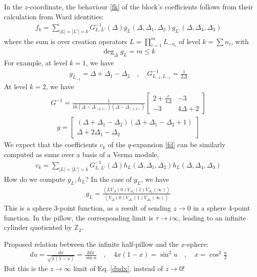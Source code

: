 \documentclass[12pt,a4paper]{article}
\begin{document}
In the $z$-coordinate, the behaviour \eqref{fk} of the block's coefficients follows from their calculation from Ward identities:
\begin{align}
 f_k = \sum_{|L|=|L'|=k} G^{-1}_{L,L'}(\Delta) g_L(\Delta,\Delta_1,\Delta_2)g_{L'}(\Delta,\Delta_4,\Delta_3)
\end{align}
where the sum is over creation operators $L=\prod_{i=1}^m L_{-n_i}$ of level $k=\sum n_i$, with 
\begin{align}
 \deg_\Delta g_L = m\leq k
\end{align}
For example, at level $k=1$, we have 
\begin{align}
 g_{L_{-1}} = \Delta + \Delta_1-\Delta_2 \quad , \quad G^{-1}_{L_{-1},L_{-1}} = \frac{1}{2\Delta} 
\end{align}
At level $k=2$, we have 
\begin{align}
G^{-1} = \frac{1}{16(\Delta-\Delta_{(2,1)})(\Delta-\Delta_{(1,2)})} \begin{bmatrix} 2+\frac{c}{4\Delta} & -3 \\ -3 & 4\Delta+2 \end{bmatrix}
\end{align}
\begin{align}
 g = \begin{bmatrix} (\Delta+\Delta_1-\Delta_2)(\Delta+\Delta_1-\Delta_2+1) \\ \Delta+2\Delta_1-\Delta_2 \end{bmatrix}
\end{align}
We expect that the coefficients $c_k$ of the $q$-expansion \eqref{fd} can be similarly computed as sums over a basis of a Verma module, 
\begin{align}
 c_k = \sum_{|L|=|L'|=k} G^{-1}_{L,L'}(\Delta) h_L(\Delta,\Delta_1,\Delta_2)h_L(\Delta,\Delta_4,\Delta_3)
\end{align}
How do we compute $g_L,h_L$? In the case of $g_L$, we have 
\begin{align}
 g_L = \frac{\left< LV_{\Delta}(0)V_{\Delta_1}(1)V_{\Delta_2}(\infty)\right>}{\left< V_{\Delta}(0)V_{\Delta_1}(1)V_{\Delta_2}(\infty)\right>}
\end{align}
This is a sphere 3-point function, as a result of sending $z\to 0$ in a sphere 4-point function. In the pillow, the corresponding limit is $\tau\to i\infty$, leading to an infinite cylinder quotiented by $\mathbb{Z}_2$. 

Proposed relation between the infinite half-pillow and the $x$-sphere:
\begin{align}
 du = \frac{dx}{\sqrt{x(1-x)}} = \frac{2dx}{\sin u} \quad , \quad 4x(1-x) = \sin^2u \quad , \quad x = \cos^2\tfrac{u}{2}
\end{align}
But this is the $z\to\infty$ limit of Eq. \eqref{dudx}, instead of $z\to 0$! 
\end{document}
